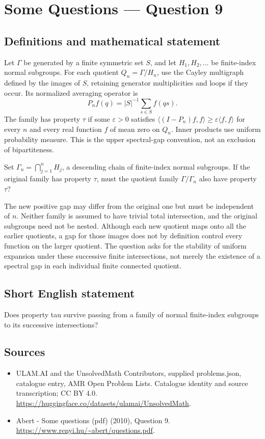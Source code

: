 \documentclass[11pt,a4paper]{article}
\begin{document}
\section*{Some Questions — Question 9}\label{statement}

\subsection{Definitions and mathematical statement}
Let $\Gamma$ be generated by a finite symmetric set $S$, and let $H_1,H_2,\ldots$ be finite-index normal subgroups. For each quotient $Q_n=\Gamma/H_n$, use the Cayley multigraph defined by the images of $S$, retaining generator multiplicities and loops if they occur. Its normalized averaging operator is
\[
 P_n f(q)=|S|^{-1}\sum_{s\in S}f(qs).
\]
The family has property $\tau$ if some $\varepsilon>0$ satisfies
$\langle(I-P_n)f,f\rangle\geq\varepsilon\langle f,f\rangle$ for every $n$ and every real function $f$ of mean zero on $Q_n$. Inner products use uniform probability measure. This is the upper spectral-gap convention, not an exclusion of bipartiteness.

Set $\Gamma_n=\bigcap_{j=1}^nH_j$, a descending chain of finite-index normal subgroups. If the original family has property $\tau$, must the quotient family $\Gamma/\Gamma_n$ also have property $\tau$?

The new positive gap may differ from the original one but must be independent of $n$. Neither family is assumed to have trivial total intersection, and the original subgroups need not be nested. Although each new quotient maps onto all the earlier quotients, a gap for those images does not by definition control every function on the larger quotient. The question asks for the stability of uniform expansion under these successive finite intersections, not merely the existence of a spectral gap in each individual finite connected quotient.
\subsection{Short English statement}
Does property tau survive passing from a family of normal finite-index subgroups to its successive intersections?
\subsection{Sources}
\begin{itemize}
\item[S1] ULAM.AI and the UnsolvedMath Contributors, supplied problems.json, catalogue entry, AMR Open Problem Lists. Catalogue identity and source transcription; CC BY 4.0.
\url{https://huggingface.co/datasets/ulamai/UnsolvedMath}.
\item[S2] Abert - Some questions (pdf) (2010), Question 9. 
\url{https://www.renyi.hu/~abert/questions.pdf}.
\end{itemize}
\end{document}
